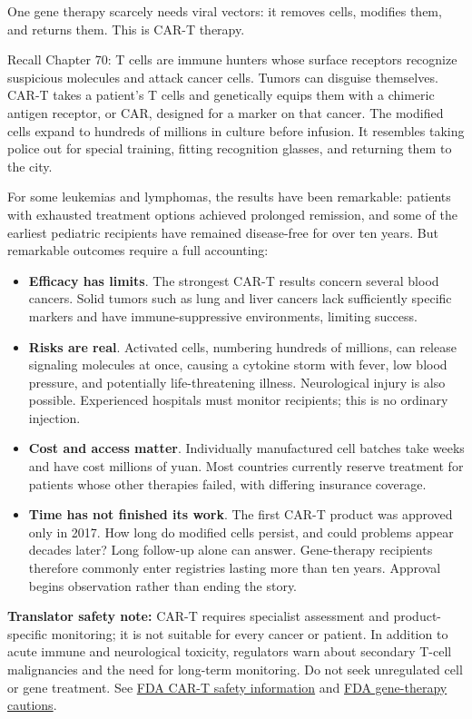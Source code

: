 One gene therapy scarcely needs viral vectors: it removes cells, modifies them, and returns them. This is CAR-T therapy.

Recall Chapter 70: T cells are immune hunters whose surface receptors recognize suspicious molecules and attack cancer cells. Tumors can disguise themselves. CAR-T takes a patient's T cells and genetically equips them with a chimeric antigen receptor, or CAR, designed for a marker on that cancer. The modified cells expand to hundreds of millions in culture before infusion. It resembles taking police out for special training, fitting recognition glasses, and returning them to the city.

For some leukemias and lymphomas, the results have been remarkable: patients with exhausted treatment options achieved prolonged remission, and some of the earliest pediatric recipients have remained disease-free for over ten years. But remarkable outcomes require a full accounting:

\begin{itemize}[itemsep=2pt]
\item \textbf{Efficacy has limits}. The strongest CAR-T results concern several blood cancers. Solid tumors such as lung and liver cancers lack sufficiently specific markers and have immune-suppressive environments, limiting success.
\item \textbf{Risks are real}. Activated cells, numbering hundreds of millions, can release signaling molecules at once, causing a cytokine storm with fever, low blood pressure, and potentially life-threatening illness. Neurological injury is also possible. Experienced hospitals must monitor recipients; this is no ordinary injection.
\item \textbf{Cost and access matter}. Individually manufactured cell batches take weeks and have cost millions of yuan. Most countries currently reserve treatment for patients whose other therapies failed, with differing insurance coverage.
\item \textbf{Time has not finished its work}. The first CAR-T product was approved only in 2017. How long do modified cells persist, and could problems appear decades later? Long follow-up alone can answer. Gene-therapy recipients therefore commonly enter registries lasting more than ten years. Approval begins observation rather than ending the story.
\end{itemize}

\textbf{Translator safety note:} CAR-T requires specialist assessment and product-specific monitoring; it is not suitable for every cancer or patient. In addition to acute immune and neurological toxicity, regulators warn about secondary T-cell malignancies and the need for long-term monitoring. Do not seek unregulated cell or gene treatment. See \href{https://www.fda.gov/vaccines-blood-biologics/safety-availability-biologics/fda-investigating-serious-risk-t-cell-malignancy-following-bcma-directed-or-cd19-directed-autologous}{FDA CAR-T safety information} and \href{https://www.fda.gov/vaccines-blood-biologics/cellular-gene-therapy-products/information-about-self-administration-gene-therapy}{FDA gene-therapy cautions}.

